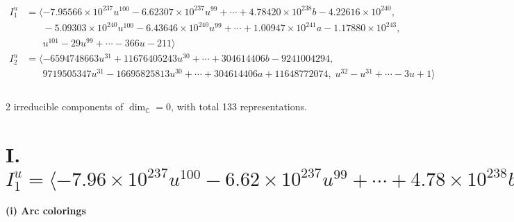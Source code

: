 \documentclass[1p]{elsarticle_modified}
\theoremstyle{definition}
\begin{document}
\begin{align*}
I^u_{1}&=\langle 
-7.95566\times10^{237} u^{100}-6.62307\times10^{237} u^{99}+\cdots+4.78420\times10^{238} b-4.22616\times10^{240},\\
\phantom{I^u_{1}}&\phantom{= \langle  }-5.09303\times10^{240} u^{100}-6.43646\times10^{240} u^{99}+\cdots+1.00947\times10^{241} a-1.17880\times10^{243},\\
\phantom{I^u_{1}}&\phantom{= \langle  }u^{101}-29 u^{99}+\cdots-366 u-211\rangle \\
I^u_{2}&=\langle 
-6594748663 u^{31}+11676405243 u^{30}+\cdots+304614406 b-9241004294,\\
\phantom{I^u_{2}}&\phantom{= \langle  }9719505347 u^{31}-16695825813 u^{30}+\cdots+304614406 a+11648772074,\;u^{32}- u^{31}+\cdots-3 u+1\rangle \\
\\
\end{align*}
\raggedright * 2 irreducible components of $\dim_{\mathbb{C}}=0$, with total 133 representations.\\
\newpage
\renewcommand{\arraystretch}{1}
\centering \section*{I. $I^u_{1}= \langle -7.96\times10^{237} u^{100}-6.62\times10^{237} u^{99}+\cdots+4.78\times10^{238} b-4.23\times10^{240},\;-5.09\times10^{240} u^{100}-6.44\times10^{240} u^{99}+\cdots+1.01\times10^{241} a-1.18\times10^{243},\;u^{101}-29 u^{99}+\cdots-366 u-211 \rangle$}
\flushleft \textbf{(i) Arc colorings}\\
\end{document}
